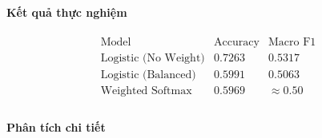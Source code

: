 \paragraph{Kết quả thực nghiệm}

\[
\begin{array}{l|c|c}
\text{Model} & \text{Accuracy} & \text{Macro F1} \\
\hline
\text{Logistic (No Weight)} & 0.7263 & 0.5317 \\
\text{Logistic (Balanced)}  & 0.5991 & 0.5063 \\
\text{Weighted Softmax}     & 0.5969 & \approx 0.50 \\
\end{array}
\]

\paragraph{Phân tích chi tiết}


